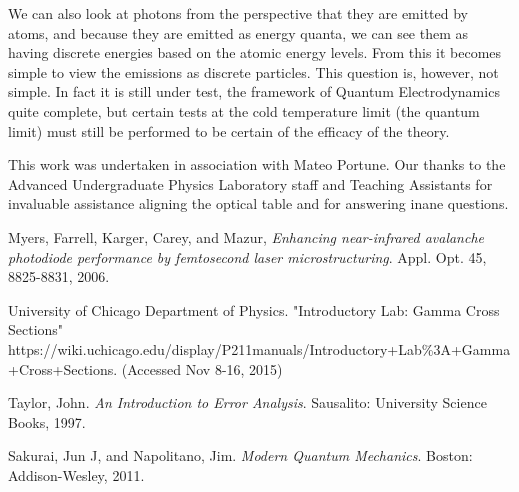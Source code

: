 \documentclass{article}
\begin{document}
\hspace{.25cm}

We can also look at photons from the perspective that they are emitted by atoms, and because they are emitted as energy quanta, we can see them as having discrete energies based on the atomic energy levels.  From this it becomes simple to view the emissions as discrete particles.  This question is, however, not simple.  In fact it is still under test, the framework of Quantum Electrodynamics quite complete, but certain tests at the cold temperature limit (the quantum limit) must still be performed to be certain of the efficacy of the theory.

\hspace{.25cm}

This work was undertaken in association with Mateo Portune.  Our thanks to the Advanced Undergraduate Physics Laboratory staff and Teaching Assistants for invaluable assistance aligning the optical table and for answering inane questions.

\begin{thebibliography}{10}
		Myers, Farrell, Karger, Carey, and Mazur, \emph{Enhancing near-infrared avalanche photodiode performance by femtosecond laser microstructuring}. Appl. Opt. 45, 8825-8831, 2006.

		University of Chicago Department of Physics. "Introductory Lab: Gamma Cross Sections"\\
		https://wiki.uchicago.edu/display/P211manuals/Introductory+Lab\%3A+Gamma+Cross+Sections. (Accessed Nov 8-16, 2015)

		Taylor, John. \emph{An Introduction to Error Analysis}. Sausalito: University Science Books, 1997.

		Sakurai, Jun J, and Napolitano, Jim. \emph{Modern Quantum Mechanics}. Boston: Addison-Wesley, 2011.

\end{thebibliography}
\end{document}

